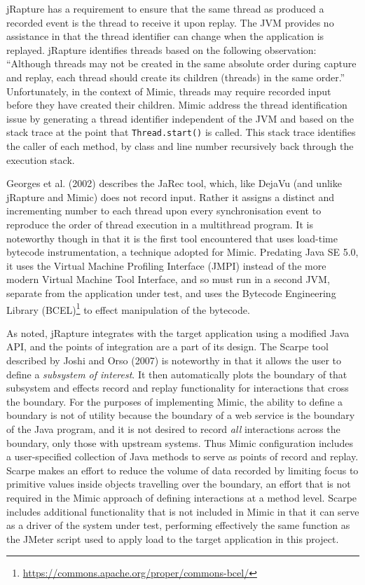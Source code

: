 \documentclass[]{final_report}
\begin{document}
jRapture has a requirement to ensure that the same thread as produced a recorded event is the thread to receive it upon replay. The JVM provides no assistance in that the thread identifier can change when the application is replayed. jRapture identifies threads based on the following observation: ``Although threads may not be created in the same absolute order during capture and replay, each thread should create its children (threads) in the same order.'' \cite{steven:2000} Unfortunately, in the context of Mimic, threads may require recorded input before they have created their children. Mimic address the thread identification issue by generating a thread identifier independent of the JVM and based on the stack trace at the point that \lstinline{Thread.start()} is called. \noop{} This stack trace identifies the caller of each method, by class and line number recursively back through the execution stack.

Georges et al. (2002) \cite{georges:2002} describes the JaRec tool, which, like DejaVu (and unlike jRapture and Mimic) does not record input. Rather it assigns a distinct and incrementing number to each thread upon every synchronisation event to reproduce the order of thread execution in a multithread program. It is noteworthy though in that it is the first tool encountered that uses load-time bytecode instrumentation, a technique adopted for Mimic. Predating Java SE 5.0, it uses the Virtual Machine Profiling Interface (JMPI) instead of the more modern Virtual Machine Tool Interface, and so must run in a second JVM, separate from the application under test, and uses the Bytecode Engineering Library (BCEL)\footnote{\url{https://commons.apache.org/proper/commons-bcel/}} to effect manipulation of the bytecode.

As noted, jRapture integrates with the target application using a modified Java API, and the points of integration are a part of its design. The Scarpe tool described by Joshi and Orso (2007) \cite{joshi:2007} is noteworthy in that it allows the user to define a \textit{subsystem of interest}. It then automatically plots the boundary of that subsystem and effects record and replay functionality for interactions that cross the boundary. For the purposes of implementing Mimic, the ability to define a boundary is not of utility because the boundary of a web service is the boundary of the Java program, and it is not desired to record \textit{all} interactions across the boundary, only those with upstream systems. Thus Mimic configuration includes a user-specified collection of Java methods to serve as points of record and replay. Scarpe makes an effort to reduce the volume of data recorded by limiting focus to primitive values inside objects travelling over the boundary, an effort that is not required in the Mimic approach of defining interactions at a method level. Scarpe includes additional functionality that is not included in Mimic in that it can serve as a driver of the system under test, performing effectively the same function as the JMeter script used to apply load to the target application in this project.
\end{document}

